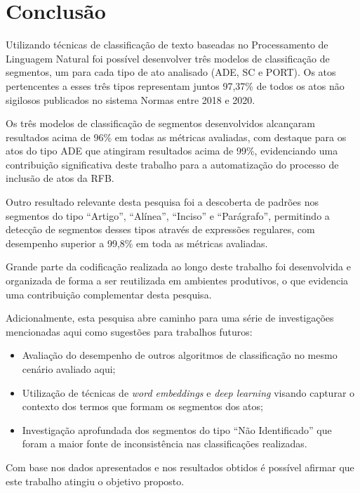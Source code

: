 \section{Conclusão}

Utilizando técnicas de classificação de texto baseadas no Processamento de Linguagem Natural foi possível desenvolver três modelos de classificação de segmentos, um para cada tipo de ato analisado (ADE, SC e PORT). Os atos pertencentes a esses três tipos representam juntos 97,37\% de todos os atos não sigilosos publicados no sistema Normas entre 2018 e 2020.

Os três modelos de classificação de segmentos desenvolvidos alcançaram resultados acima de 96\% em todas as métricas avaliadas, com destaque para os atos do tipo ADE que atingiram resultados acima de 99\%, evidenciando uma contribuição significativa deste trabalho para a automatização do processo de inclusão de atos da RFB.

Outro resultado relevante desta pesquisa foi a descoberta de padrões nos segmentos do tipo ``Artigo'', ``Alínea'', ``Inciso'' e ``Parágrafo'', permitindo a detecção de segmentos desses tipos através de expressões regulares, com desempenho superior a 99,8\% em toda as métricas avaliadas. 

Grande parte da codificação realizada ao longo deste trabalho foi desenvolvida e organizada de forma a ser reutilizada em ambientes produtivos, o que evidencia uma contribuição complementar desta pesquisa.

Adicionalmente, esta pesquisa abre caminho para uma série de investigações mencionadas aqui como sugestões para trabalhos futuros: 
\begin{itemize}
	\item Avaliação do desempenho de outros algoritmos de classificação no mesmo cenário avaliado aqui;
	\item Utilização de técnicas de \textit{word embeddings} e \textit{deep learning} visando capturar o contexto dos termos que formam os segmentos dos atos;
	\item Investigação aprofundada dos segmentos do tipo ``Não Identificado'' que foram a maior fonte de inconsistência nas classificações realizadas.
\end{itemize}

Com base nos dados apresentados e nos resultados obtidos é possível afirmar que este trabalho atingiu o objetivo proposto.


\begin{figure}
\label{fig:fake}
\end{figure}